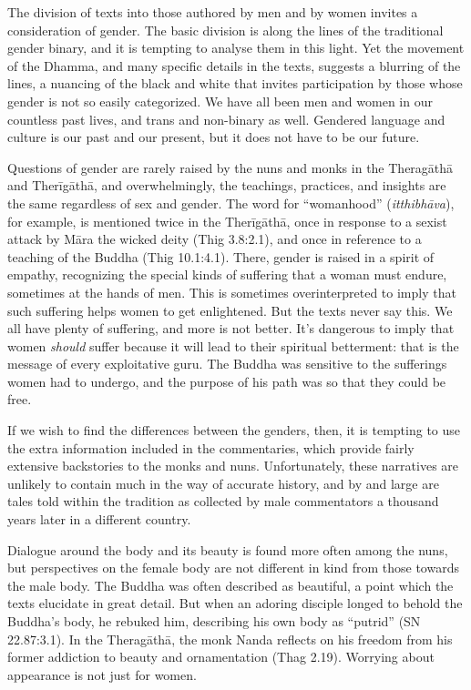 \documentclass[12pt,openany]{book}%
\begin{document}
The division of texts into those authored by men and by women invites a consideration of gender. The basic division is along the lines of the traditional gender binary, and it is tempting to analyse them in this light. Yet the movement of the Dhamma, and many specific details in the texts, suggests a blurring of the lines, a nuancing of the black and white that invites participation by those whose gender is not so easily categorized. We have all been men and women in our countless past lives, and trans and non-binary as well. Gendered language and culture is our past and our present, but it does not have to be our future.

Questions of gender are rarely raised by the nuns and monks in the \textsanskrit{Theragāthā} and \textsanskrit{Therīgāthā}, and overwhelmingly, the teachings, practices, and insights are the same regardless of sex and gender. The word for “womanhood” (\textit{\textsanskrit{itthibhāva}}), for example, is mentioned twice in the \textsanskrit{Therīgāthā}, once in response to a sexist attack by \textsanskrit{Māra} the wicked deity (Thig 3.8:2.1), and once in reference to a teaching of the Buddha (Thig 10.1:4.1). There, gender is raised in a spirit of empathy, recognizing the special kinds of suffering that a woman must endure, sometimes at the hands of men. This is sometimes overinterpreted to imply that such suffering helps women to get enlightened. But the texts never say this. We all have plenty of suffering, and more is not better. It’s dangerous to imply that women \emph{should} suffer because it will lead to their spiritual betterment: that is the message of every exploitative guru. The Buddha was sensitive to the sufferings women had to undergo, and the purpose of his path was so that they could be free.

If we wish to find the differences between the genders, then, it is tempting to use the extra information included in the commentaries, which provide fairly extensive backstories to the monks and nuns. Unfortunately, these narratives are unlikely to contain much in the way of accurate history, and by and large are tales told within the tradition as collected by male commentators a thousand years later in a different country.

Dialogue around the body and its beauty is found more often among the nuns, but perspectives on the female body are not different in kind from those towards the male body. The Buddha was often described as beautiful, a point which the texts elucidate in great detail. But when an adoring disciple longed to behold the Buddha’s body, he rebuked him, describing his own body as “putrid” (SN 22.87:3.1). In the \textsanskrit{Theragāthā}, the monk Nanda reflects on his freedom from his former addiction to beauty and ornamentation (Thag 2.19). Worrying about appearance is not just for women.
\end{document}
